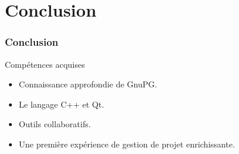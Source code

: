 \section{Conclusion}
\begin{frame}
  \frametitle{\color{white}Conclusion}
  \begin{block}{Compétences acquises}
      \begin{itemize}
        \item Connaissance approfondie de GnuPG.
        \item Le langage C++ et Qt.
        \item Outils collaboratifs.
        \item Une première expérience de gestion de projet enrichissante.
      \end{itemize}
    \end{block}
\end{frame}
        
